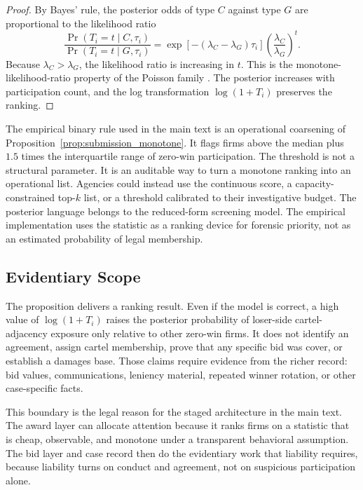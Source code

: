 \begin{proof}
By Bayes' rule, the posterior odds of type $C$ against type $G$
are proportional to the likelihood ratio
\[
  \frac{\Pr(T_i=t\mid C,\tau_i)}
       {\Pr(T_i=t\mid G,\tau_i)}
  =
  \exp[-(\lambda_C-\lambda_G)\tau_i]
  \left(\frac{\lambda_C}{\lambda_G}\right)^t .
\]
Because $\lambda_C>\lambda_G$, the likelihood ratio is increasing
in $t$. This is the monotone-likelihood-ratio property of the
Poisson family \citep{karlin1956mlr}. The posterior increases
with participation count, and the log transformation
$\log(1+T_i)$ preserves the ranking.
\end{proof}

The empirical binary rule used in the main text is an operational
coarsening of Proposition~\ref{prop:submission_monotone}. It flags firms above the
median plus $1.5$ times the interquartile range of zero-win
participation. The threshold is not a structural parameter. It
is an auditable way to turn a monotone ranking into an
operational list. Agencies could instead use the continuous
score, a capacity-constrained top-$k$ list, or a threshold
calibrated to their investigative budget.
The posterior language belongs to the reduced-form screening
model. The empirical implementation uses the statistic as a
ranking device for forensic priority, not as an estimated
probability of legal membership.

\subsection{Evidentiary Scope}
\label{app:framework_scope}

The proposition delivers a ranking result. Even if the model is
correct, a high value of
$\log(1+T_i)$ raises the posterior probability of loser-side
cartel-adjacency exposure only relative to other zero-win firms.
It does not
identify an agreement, assign cartel membership, prove that any
specific bid was cover, or establish a damages base. Those
claims require evidence from the richer record: bid values,
communications, leniency material, repeated winner rotation, or
other case-specific facts.

This boundary is the legal reason for the staged architecture in
the main text. The award layer can allocate attention because it
ranks firms on a statistic that is cheap, observable, and
monotone under a transparent behavioral assumption. The bid layer
and case record then do the evidentiary work that liability
requires, because liability turns on conduct and agreement, not
on suspicious participation alone.

